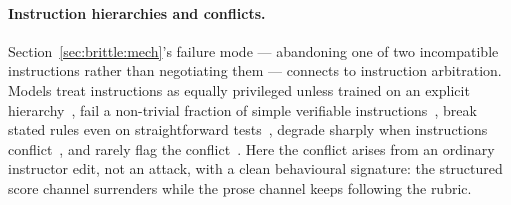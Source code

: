\paragraph{Instruction hierarchies and conflicts.}
Section~\ref{sec:brittle:mech}'s failure mode --- abandoning one of two incompatible instructions rather than negotiating them --- connects to instruction arbitration. Models treat instructions as equally privileged unless trained on an explicit hierarchy~\citep{wallace2024instructionhierarchy}, fail a non-trivial fraction of simple verifiable instructions~\citep{zhou2023instructionfollowingevaluationlarge}, break stated rules even on straightforward tests~\citep{mu2023llmsfollowsimplerules}, degrade sharply when instructions conflict~\citep{zhang2025ihevalevaluatinglanguagemodels}, and rarely flag the conflict~\citep{he2025coninstructevaluatinglargelanguage}. Here the conflict arises from an ordinary instructor edit, not an attack, with a clean behavioural signature: the structured score channel surrenders while the prose channel keeps following the rubric.
